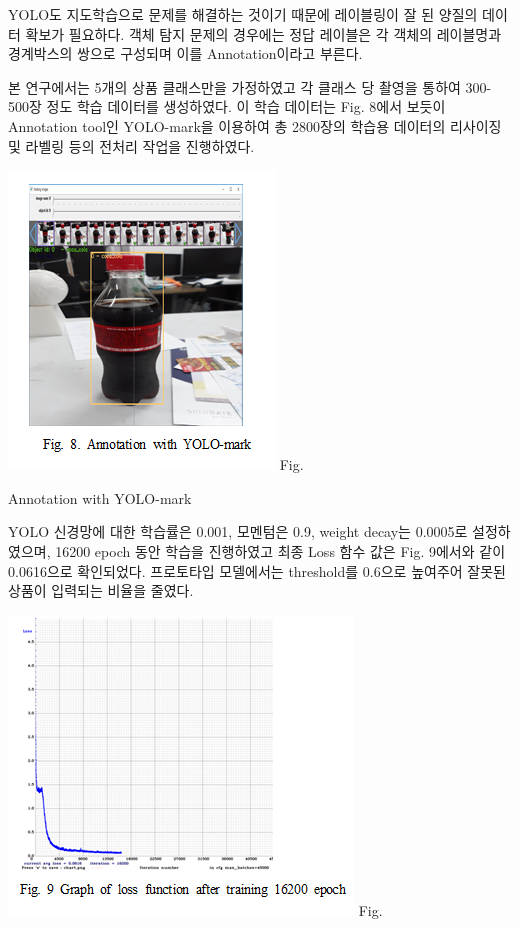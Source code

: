 \documentclass[smallextended]{svjour3}       %
\begin{document}
YOLO도 지도학습으로 문제를 해결하는 것이기 때문에 레이블링이 잘 된
양질의 데이터 확보가 필요하다. 객체 탐지 문제의 경우에는 정답 레이블은
각 객체의 레이블명과 경계박스의 쌍으로 구성되며 이를 Annotation이라고
부른다.

본 연구에서는 5개의 상품 클래스만을 가정하였고 각 클래스 당 촬영을
통하여 300-500장 정도 학습 데이터를 생성하였다. 이 학습 데이터는 Fig.
8에서 보듯이 Annotation tool인 YOLO-mark을 이용하여 총 2800장의 학습용
데이터의 리사이징 및 라벨링 등의 전처리 작업을 진행하였다.

\includegraphics{../fig/fig8.png} Fig.

Annotation with YOLO-mark

YOLO 신경망에 대한 학습률은 0.001, 모멘텀은 0.9, weight decay는 0.0005로
설정하였으며, 16200 epoch 동안 학습을 진행하였고 최종 Loss 함수 값은
Fig. 9에서와 같이 0.0616으로 확인되었다. 프로토타입 모델에서는
threshold를 0.6으로 높여주어 잘못된 상품이 입력되는 비율을 줄였다.

\includegraphics{../fig/fig9.png} Fig.
\end{document}
